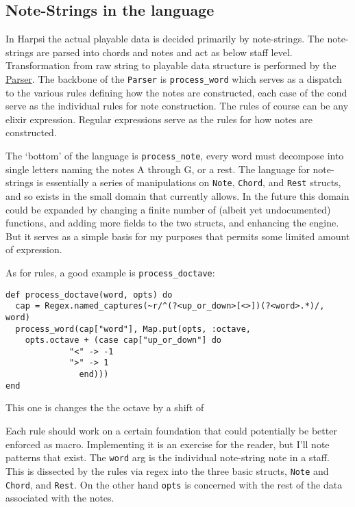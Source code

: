 \documentclass[11pt]{article}
\begin{document}
\subsection{Note-Strings in the language}
\label{sec-3-1}
In Harpsi the actual playable data is decided primarily by
note-strings. The note-strings are parsed into chords and notes and
act as below staff level. Transformation from raw string to
playable data structure is performed by the \href{lib/parser.ex}{Parser}. The
backbone of the \texttt{Parser} is \texttt{process\_word} which serves as a
dispatch to the various rules defining how the notes are
constructed, each case of the cond serve as the individual rules
for note construction. The rules of course can be any elixir
expression. Regular expressions serve as the rules for how notes
are constructed.

The `bottom' of the language is \texttt{process\_note}, every word must
decompose into single letters naming the notes A through G, or a
rest. The language for note-strings is essentially a series of
manipulations on \texttt{Note}, \texttt{Chord}, and \texttt{Rest} structs, and so exists in the
small domain that currently allows. In the future this domain could
be expanded by changing a finite number of (albeit yet
undocumented) functions, and adding more fields to the two structs,
and enhancing the engine. But it serves as a simple basis for my
purposes that permits some limited amount of expression.

As for rules, a good example is \texttt{process\_doctave}:
\begin{verbatim}
def process_doctave(word, opts) do
  cap = Regex.named_captures(~r/^(?<up_or_down>[<>])(?<word>.*)/, word)
  process_word(cap["word"], Map.put(opts, :octave,
	opts.octave + (case cap["up_or_down"] do
			 "<" -> -1
			 ">" -> 1
		       end)))
end
\end{verbatim}
This one is changes the the octave by a shift of

Each rule should work on a certain foundation that could
potentially be better enforced as macro. Implementing it is an
exercise for the reader, but I'll note patterns that exist. The
\texttt{word} arg is the individual note-string note in a staff. This is
dissected by the rules via regex into the three basic structs,
\texttt{Note} and \texttt{Chord}, and \texttt{Rest}. On the other hand \texttt{opts} is
concerned with the rest of the data associated with the notes.
\end{document}
